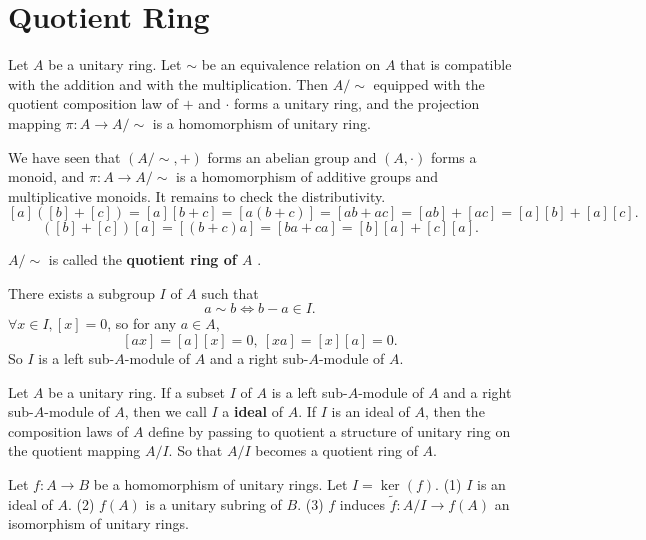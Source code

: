 \section{Quotient Ring}
\begin{propositionenv}
    Let $A$ be a unitary ring. Let $\sim$ be an equivalence relation on $A$ that is compatible with the addition and with the multiplication. Then $A/\sim$ equipped with the quotient composition law of $+$ and $\cdot$ forms a unitary ring, and the projection mapping $\pi:A\longrightarrow A/\sim$ is a homomorphism of unitary ring.
\end{propositionenv}
\begin{proofenv}
    We have seen that $(A/\sim,+)$ forms an abelian group and $(A,\cdot)$ forms a monoid, and $\pi:A\longrightarrow A/\sim$ is a homomorphism of additive groups and multiplicative monoids. It remains to check the distributivity.
    $$[a]([b]+[c])=[a][b+c]=[a(b+c)]=[ab+ac]=[ab]+[ac]=[a][b]+[a][c].$$
    $$([b]+[c])[a]=[(b+c)a]=[ba+ca]=[b][a]+[c][a].$$
\end{proofenv}
\begin{definitionenv}
    $A/\sim$ is called the \textbf{quotient ring of $A$ }.
\end{definitionenv}
\begin{remark}
    There exists a subgroup $I$ of $A$ such that 
    $$a\sim b\Leftrightarrow b-a\in I.$$
    $\forall x\in I,[x]=0$, so  for any $ a\in A$,
    $$[ax]=[a][x]=0,\ [xa]=[x][a]=0.$$
    So $I$ is a left sub-$A$-module of $A$ and a right sub-$A$-module of $A$.
\end{remark}
\begin{definitionenv}
    Let $A$ be a unitary ring. If a subset $I$ of $A$ is a left sub-$A$-module of $A$ and a right sub-$A$-module of $A$, then we call $I$ a \textbf{ideal} of $A$. If $I$ is an ideal of $A$, then the composition laws of $A$ define by passing to quotient a structure of unitary ring on the quotient mapping $A/I$. So that $A/I$ becomes a quotient ring of $A$.
\end{definitionenv}
\begin{theoremenv}
    Let $f:A\rightarrow B$ be a homomorphism of unitary rings. Let $I=\ker(f)$.
    \newline
    (1) $I$ is an ideal of $A$.
    \newline
    (2) $f(A)$ is a unitary subring of $B$.
    \newline
    (3) $f$ induces $\tilde{f}:A/I\longrightarrow f(A)$ an isomorphism of unitary rings.
\end{theoremenv}
